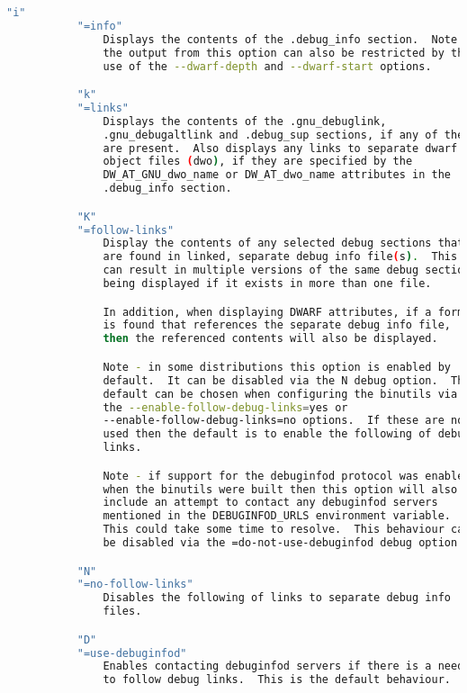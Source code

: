 {{\begin{lstlisting}[language=bash]
           "i"
           "=info"
               Displays the contents of the .debug_info section.  Note:
               the output from this option can also be restricted by the
               use of the --dwarf-depth and --dwarf-start options.

           "k"
           "=links"
               Displays the contents of the .gnu_debuglink,
               .gnu_debugaltlink and .debug_sup sections, if any of them
               are present.  Also displays any links to separate dwarf
               object files (dwo), if they are specified by the
               DW_AT_GNU_dwo_name or DW_AT_dwo_name attributes in the
               .debug_info section.

           "K"
           "=follow-links"
               Display the contents of any selected debug sections that
               are found in linked, separate debug info file(s).  This
               can result in multiple versions of the same debug section
               being displayed if it exists in more than one file.

               In addition, when displaying DWARF attributes, if a form
               is found that references the separate debug info file,
               then the referenced contents will also be displayed.

               Note - in some distributions this option is enabled by
               default.  It can be disabled via the N debug option.  The
               default can be chosen when configuring the binutils via
               the --enable-follow-debug-links=yes or
               --enable-follow-debug-links=no options.  If these are not
               used then the default is to enable the following of debug
               links.

               Note - if support for the debuginfod protocol was enabled
               when the binutils were built then this option will also
               include an attempt to contact any debuginfod servers
               mentioned in the DEBUGINFOD_URLS environment variable.
               This could take some time to resolve.  This behaviour can
               be disabled via the =do-not-use-debuginfod debug option.

           "N"
           "=no-follow-links"
               Disables the following of links to separate debug info
               files.

           "D"
           "=use-debuginfod"
               Enables contacting debuginfod servers if there is a need
               to follow debug links.  This is the default behaviour.


\end{lstlisting}}}
